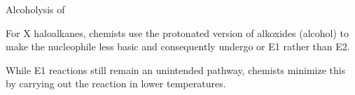 \documentclass[10pt]{article}
\begin{document}
  \begin{core}{Alcoholysis of }
    
    For X haloalkanes, chemists use the protonated version of alkoxides (alcohol) to make the nucleophile less basic and consequently undergo \sno or E1 rather than E2.


    While E1 reactions still remain an unintended pathway, chemists minimize this by carrying out the reaction in lower temperatures.

  \end{core}
\end{document}
